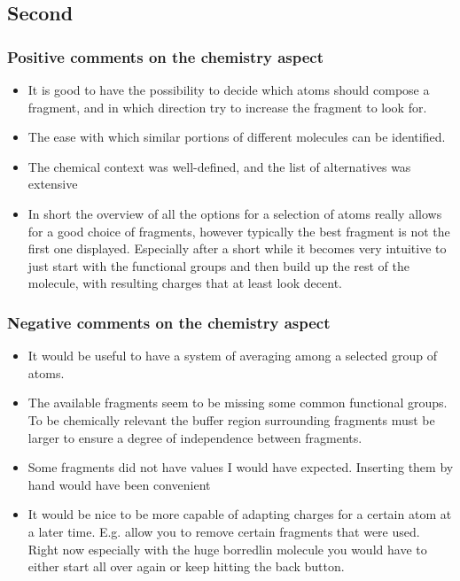\subsection{Second}
\subsubsection{Positive comments on the chemistry aspect}
\begin{itemize}
\item It is good to have the possibility to decide which atoms should compose a fragment, and in which direction try to increase the fragment to look for.




\item The ease with which similar portions of different molecules can be identified.

\item The chemical context was well-defined, and the list of alternatives was extensive

\item In short the overview of all the options for a selection of atoms really allows for a good choice of fragments, however typically the best fragment is not the first one displayed. Especially after a short while it becomes very intuitive to just start with the functional groups and then build up the rest of the molecule, with resulting charges that at least look decent.

\end{itemize}


\subsubsection{Negative comments on the chemistry aspect}
\begin{itemize}
\item It would be useful to have a system of averaging among a selected group of atoms.

\item The available fragments seem to be missing some common functional groups. To be chemically relevant the buffer region surrounding fragments must be larger to ensure a degree of independence between fragments. 

\item Some fragments did not have values I would have expected. Inserting them by hand would have been convenient

\item It would be nice to be more capable of adapting charges for a certain atom at a later time. E.g. allow you to remove certain fragments that were used. Right now especially with the huge borredlin molecule you would have to either start all over again or keep hitting the back button. 

\end{itemize}


